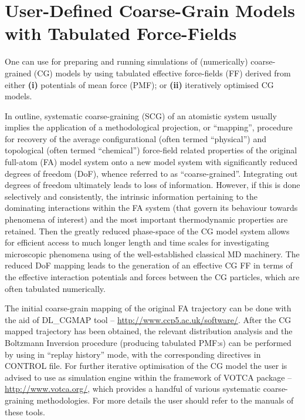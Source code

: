 \section{User-Defined Coarse-Grain Models with Tabulated Force-Fields}
\label{cg-intro}

One can use \D for preparing and running simulations of (numerically)
coarse-grained (CG) models by using tabulated effective force-fields
(FF) derived from either {\bf (i)} potentials of mean force (PMF);
or {\bf (ii)} iteratively optimised CG models.

In outline, systematic coarse-graining (SCG) of an atomistic system usually
implies the application of a methodological projection, or ``mapping'',
procedure for recovery of the average configurational (often termed
``physical'') and topological (often termed ``chemical'') force-field related
properties of the original full-atom (FA) model system onto a new model
system with significantly reduced degrees of freedom (DoF), whence referred
to as ``coarse-grained''.  Integrating out degrees of freedom ultimately
leads to loss of information.  However, if this is done selectively and
consistently, the intrinsic information pertaining to the dominating
interactions within the FA system (that govern its behaviour towards
phenomena of interest) and the most important thermodynamic properties
are retained.  Then the greatly reduced phase-space of the CG model system
allows for efficient access to much longer length and time scales for
investigating microscopic phenomena using of the well-established
classical MD machinery.  The reduced DoF mapping leads to the generation
of an effective CG FF in terms of the effective interaction potentials
and forces between the CG particles, which are often tabulated numerically.

The initial coarse-grain mapping of the original FA trajectory can be done
with the aid of DL\_CGMAP tool -- \href{http://www.ccp5.ac.uk/software/}
{http://www.ccp5.ac.uk/software/}. After the CG mapped trajectory
has been obtained, the relevant distribution analysis and the Boltzmann
Inversion procedure (producing tabulated PMF:s) can be performed by using \D
in ``replay history'' mode, with the corresponding directives in CONTROL file.
For further iterative optimisation of the CG model the user is advised
to use \D as simulation engine within the framework of VOTCA package --
\href{http://www.votca.org/}{http://www.votca.org/}, which
provides a handful of various systematic coarse-graining methodologies.
For more details the user should refer to the manuals of these tools.

